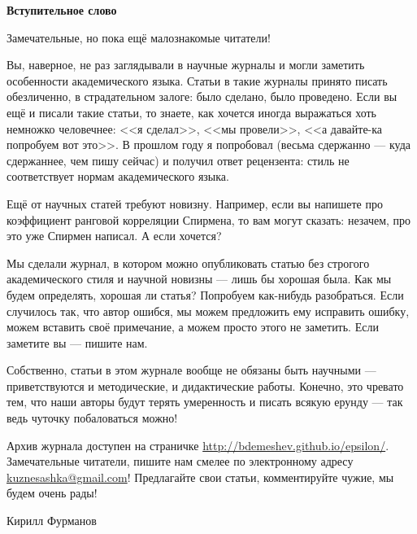 \documentclass[11pt]{article}
\begin{document}
\pagestyle{empty}

\begin{center}
\Large\textbf{Вступительное слово}
\end{center}


Замечательные, но пока ещё малознакомые читатели!

Вы, наверное, не раз заглядывали в научные журналы и могли заметить
особенности академического языка. Статьи в такие журналы принято
писать обезличенно, в страдательном залоге: было сделано, было
проведено. Если вы ещё и писали такие статьи, то знаете, как хочется
иногда выражаться хоть немножко человечнее: <<я сделал>>, <<мы провели>>,
<<а давайте-ка попробуем вот это>>. В прошлом году я попробовал (весьма
сдержанно --- куда сдержаннее, чем пишу сейчас) и получил ответ
рецензента: стиль не соответствует нормам академического языка.

Ещё от научных статей требуют новизну. Например, если вы напишете про
коэффициент ранговой корреляции Спирмена, то вам могут сказать:
незачем, про это уже Спирмен написал. А если хочется?

Мы сделали журнал, в котором можно опубликовать статью без строгого
академического стиля и научной новизны --- лишь бы хорошая была. Как мы
будем определять, хорошая ли статья? Попробуем как-нибудь разобраться.
Если случилось так, что автор ошибся, мы можем предложить ему
исправить ошибку, можем вставить своё примечание, а можем просто этого
не заметить. Если заметите вы --- пишите нам.

Собственно, статьи в этом журнале вообще не обязаны быть научными ---
приветствуются и методические, и дидактические работы. Конечно, это
чревато тем, что наши авторы будут терять умеренность и писать всякую
ерунду --- так ведь чуточку побаловаться можно!


Архив журнала доступен на страничке \url{http://bdemeshev.github.io/epsilon/}. Замечательные читатели, пишите
нам смелее по электронному адресу \href{mailto:kuznesashka@gmail.com}{kuznesashka@gmail.com}! Предлагайте свои статьи, комментируйте чужие, мы будем очень рады!

\begin{flushright}
Кирилл Фурманов
\end{flushright}
\end{document}
